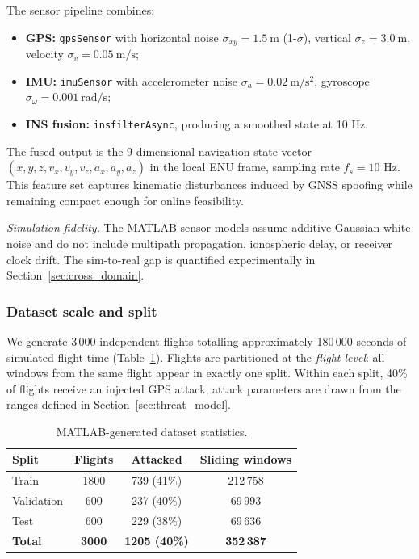 \documentclass{ieeeaccess}
\begin{document}
The sensor pipeline combines:
\begin{itemize}
  \item \textbf{GPS:} \texttt{gpsSensor} with horizontal noise $\sigma_{xy}=\SI{1.5}{\metre}$
        (1-$\sigma$), vertical $\sigma_z=\SI{3.0}{\metre}$, velocity $\sigma_v=\SI{0.05}{\metre\per\second}$;
  \item \textbf{IMU:} \texttt{imuSensor} with accelerometer noise $\sigma_a=\SI{0.02}{\metre\per\second\squared}$,
        gyroscope $\sigma_\omega=\SI{0.001}{\radian\per\second}$;
  \item \textbf{INS fusion:} \texttt{insfilterAsync}, producing a smoothed state at 10 Hz.
\end{itemize}

The fused output is the 9-dimensional navigation state vector
$(x,y,z,v_x,v_y,v_z,a_x,a_y,a_z)$ in the local ENU frame, sampling rate $f_s=10$ Hz.
This feature set captures kinematic disturbances induced by GNSS spoofing while
remaining compact enough for online feasibility.

\textit{Simulation fidelity.} The MATLAB sensor models assume additive Gaussian
white noise and do not include multipath propagation, ionospheric delay, or
receiver clock drift. The sim-to-real gap is quantified experimentally in
Section~\ref{sec:cross_domain}.

\subsubsection{Dataset scale and split}

We generate 3\,000 independent flights totalling approximately 180\,000 seconds
of simulated flight time (Table~\ref{tab:dataset}).
Flights are partitioned at the \emph{flight level}: all windows from the same
flight appear in exactly one split. Within each split, 40\% of flights receive an
injected GPS attack; attack parameters are drawn from the ranges defined in
Section~\ref{sec:threat_model}.

\begin{table}[!t]
\caption{MATLAB-generated dataset statistics.}
\label{tab:dataset}
\centering
\begin{tabular}{lccc}
\hline
\textbf{Split} & \textbf{Flights} & \textbf{Attacked} & \textbf{Sliding windows} \\
\hline
Train      & 1800 & 739 (41\%) & 212\,758 \\
Validation & 600  & 237 (40\%) & 69\,993  \\
Test       & 600  & 229 (38\%) & 69\,636  \\
\hline
\textbf{Total} & \textbf{3000} & \textbf{1205 (40\%)} & \textbf{352\,387} \\
\hline
\end{tabular}
\end{table}
\end{document}

